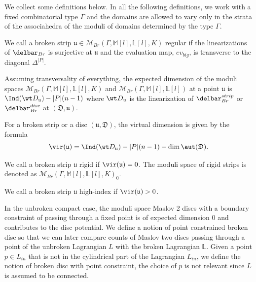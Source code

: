 We collect some definitions below. In all the following definitions, we work with a fixed combinatorial type $\Gamma$ and the domains are allowed to vary only in the strata of the associahedra of the moduli of domains determined by the type $\Gamma$.

\begin{defn} \label{defn:brokendiscreg}
We call a broken strip $\mathfrak{u} \in \mathcal{M}_{Br}(\Gamma,\mathbb{M}[l],\mathbb{L}[l],K) $ regular if the linearizations of $\delbar_{Br}$ is surjective at $\mathfrak{u}$  and the evaluation map, $ev_{big}$,  is transverse to the diagonal $\Delta^{|P|}$.

\end{defn}


\noindent Assuming transversality of everything, the expected dimension of the moduli spaces $\mathcal{M}_{Br}(\Gamma,\mathbb{M}[l],\mathbb{L}[l],K)$ and $\mathcal{M}_{Br}(\Gamma,\mathbb{M}[l],\mathbb{L}[l])$ at a point $\mathfrak{u}$ is $\Ind(\wt D_\mathfrak{u}) - |P|(n-1)$ where $\wt D_u$ is 
the linearization of $\delbar^{strip}_{Br}$ or $\delbar^{disc}_{Br}$ at $\mathfrak{(D,u)}$. 

\begin{defn}
For a broken strip or a disc $(\mathfrak{u,D})$, the virtual dimension is given by the formula $$\vir (\mathfrak{u}) = \Ind(\wt D_\mathfrak{u}) - |P|(n-1) - \dim \aut(\mathfrak{D}).$$
\end{defn}


\begin{defn}
We call a broken strip $\mathfrak{u}$ rigid if $\vir(\mathfrak{u}) = 0$. The moduli space of rigid strips is denoted as $\mathcal{M}_{Br}(\Gamma,\mathbb{M}[l],\mathbb{L}[l],K)_0$.

\end{defn}


\begin{defn}
We call a broken strip $\mathfrak{u}$ high-index if $\vir(\mathfrak{u}) > 0$.

\end{defn}


In the unbroken compact case, the moduli space Maslov 2 discs with a boundary constraint of passing through a fixed point is of expected dimension $0$ and contributes to the disc potential. We define a notion of point constrained broken disc so that we can later compare counts of Maslov two discs passing through a point of the unbroken Lagrangian $L$ with the broken Lagrangian $\mathbb{L}$. Given a point $p\in L_{in}$ that is not in the cylindrical part of the Lagrangian $L_{in}$, we define the notion of broken disc with point constraint, the choice of $p$ is not relevant since $L$ is assumed to be connected.

